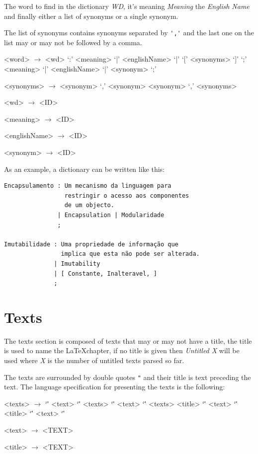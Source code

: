 \documentclass[a4paper]{report}
\begin{document}
The word to find in the dictionary \textit{WD}, it's meaning \textit{Meaning}
the \textit{English Name} and finally either a list of synonyms or a single
synonym.

The list of synonyms contains synonyms separated by \verb!','! and the last one
on the list may or may not be followed by a comma.

\begin{grammar}
    <word> $\to$ <wd> `:' <meaning> `|' <englishName> `|' `[' <synonyms> `]' `;'
    \alt <meaning> `|' <englishName> `|' <synonym> `;'

    <synonyms> $\to$ <synonym> `,'
    \alt <synonym>
    \alt <synonym> `,' <synonyms>

    <wd> $\to$ <ID>

    <meaning> $\to$ <ID>

    <englishName> $\to$ <ID>

    <synonym> $\to$ <ID>
\end{grammar}

As an example, a dictionary can be written like this:

\begin{verbatim}
Encapsulamento : Um mecanismo da linguagem para
                 restringir o acesso aos componentes
                 de um objecto.
               | Encapsulation | Modularidade
               ;

Imutabilidade : Uma propriedade de informação que
                implica que esta não pode ser alterada.
              | Imutability
              | [ Constante, Inalteravel, ]
              ;
\end{verbatim}

\section{Texts}\label{sec:texts}

The texts section is composed of texts that may or may not have a title, the
title is used to name the \LaTeX chapter, if no title is given then
\textit{Untitled X} will be used where \textit{X} is the number of untitled
texts parsed so far.

The texts are surrounded by double quotes \verb!"! and their title is text
preceding the text. The language specification for presenting the texts is the
following:

\begin{grammar}
    <texts> $\to$ `\"' <text> `\"'
    \alt <texts> `\"' <text> `\"'
    \alt <texts> <title> `\"' <text> `\"'
    \alt <title> `\"' <text> `\"'

    <text> $\to$ <TEXT>

    <title> $\to$ <TEXT>
\end{grammar}
\end{document}

